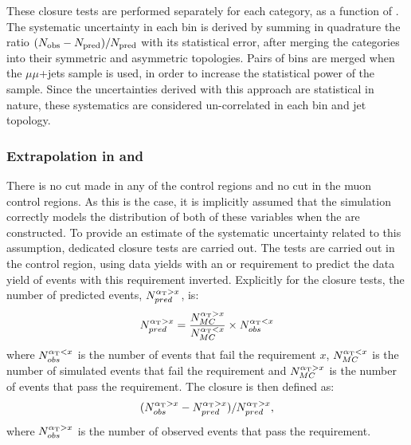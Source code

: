 These closure tests are performed separately for each \njet category,
as a function of \HT. The systematic uncertainty in each \HT bin
is derived by summing in quadrature the ratio $(N_{\textrm{obs}} - N_{\textrm{pred}})/N_{\textrm{pred}}$
with its statistical error, after merging the \njet categories into
their symmetric and asymmetric topologies. Pairs of \HT bins are merged
when the $\mu\mu$+jets sample is used, in order to increase the
statistical power of the sample.  Since the uncertainties derived with
this approach are statistical in nature, these systematics are
considered un-correlated in each \HT bin and jet topology. 

\subsubsection*{Extrapolation in \alphat and \bdphi}
\label{sec:tfSyst_alphaT}

There is no \bdphi cut made in any of the control regions and no
\alphat cut in the muon control regions. As this is the case, it is
implicitly assumed that the simulation correctly models the
distribution of both of these variables when the \TFs are constructed.
To provide an estimate of the systematic uncertainty related to this
assumption, dedicated closure tests are carried out.  
The tests are carried out in the \mj control region, using data yields
with an \alphat or \bdphi requirement to predict the data yield of
events with this requirement inverted. Explicitly for the \alphat
closure tests, the number of
predicted events, $N^{\alpha_{\text{T}}>x}_{pred}$, is: 
\begin{equation}
N^{\alpha_{\text{T}}>x}_{pred} =
\frac{N^{\alpha_{\text{T}}>x}_{MC}}{N^{\alpha_{\text{T}}<x}_{MC}}\times N^{\alpha_{\text{T}}<x}_{obs} 
\end{equation}
where $N^{\alpha_{\text{T}}<x}_{obs}$ is the number of events that fail the
\alphat requirement $x$, $N^{\alpha_{\text{T}}<x}_{MC}$ is the number of simulated
events that fail the requirement and $N^{\alpha_{\text{T}}>x}_{MC}$ is the
number of events that pass the requirement. The closure is then
defined as:
\begin{equation}
(N^{\alpha_{\text{T}}>x}_{obs}-N^{\alpha_{\text{T}}>x}_{pred})/N^{\alpha_{\text{T}}>x}_{pred},
\end{equation}
where $N^{\alpha_{\text{T}}>x}_{obs}$ is the number of observed events that pass
the \alphat requirement.

